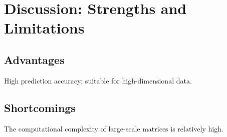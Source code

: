 \section{Discussion: Strengths and Limitations}\subsection{Advantages}High prediction accuracy; suitable for high-dimensional data.\subsection{Shortcomings}The computational complexity of large-scale matrices is relatively high.
